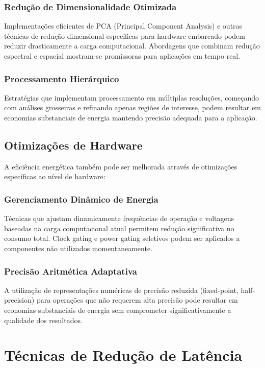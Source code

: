 \subsubsection{Redução de Dimensionalidade Otimizada}
Implementações eficientes de PCA (Principal Component Analysis) e outras técnicas de redução dimensional específicas para hardware embarcado podem reduzir drasticamente a carga computacional. Abordagens que combinam redução espectral e espacial mostram-se promissoras para aplicações em tempo real.

\subsubsection{Processamento Hierárquico}
Estratégias que implementam processamento em múltiplas resoluções, começando com análises grosseiras e refinando apenas regiões de interesse, podem resultar em economias substanciais de energia mantendo precisão adequada para a aplicação.

\subsection{Otimizações de Hardware}
A eficiência energética também pode ser melhorada através de otimizações específicas ao nível de hardware:

\subsubsection{Gerenciamento Dinâmico de Energia}
Técnicas que ajustam dinamicamente frequências de operação e voltagens baseadas na carga computacional atual permitem redução significativa no consumo total. Clock gating e power gating seletivos podem ser aplicados a componentes não utilizados momentaneamente.

\subsubsection{Precisão Aritmética Adaptativa}
A utilização de representações numéricas de precisão reduzida (fixed-point, half-precision) para operações que não requerem alta precisão pode resultar em economias substanciais de energia sem comprometer significativamente a qualidade dos resultados.

\section{Técnicas de Redução de Latência}\label{sec:reducao_latencia}


